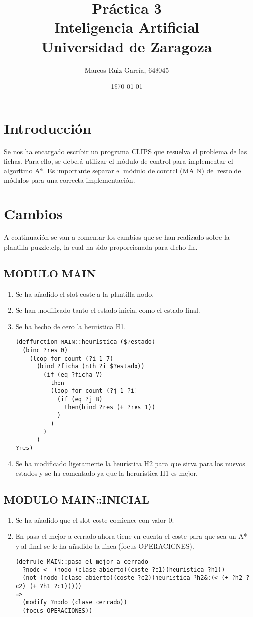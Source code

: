 \documentclass[a4paper]{article}
\title{Práctica 3 \\ Inteligencia Artificial \\ \large Universidad de Zaragoza}
\author{Marcos Ruiz García, 648045}
\date{\today}
\begin{document}
\maketitle


\section{Introducción}
Se nos ha encargado escribir un programa CLIPS que resuelva el problema de las fichas. Para ello, se deberá utilizar el módulo de control para implementar el algoritmo A*. Es importante separar el módulo de control (MAIN) del resto de módulos para una correcta implementación.

\section{Cambios}
A continuación se van a comentar los cambios que se han realizado sobre la plantilla puzzle.clp, la cual ha sido proporcionada para dicho fin.

\subsection{MODULO MAIN}
\begin{enumerate}
\item Se ha añadido el slot coste a la plantilla nodo.
\item Se han modificado tanto el estado-inicial como el estado-final.
\item Se ha hecho de cero la heurística H1.
\begin{lstlisting}
(deffunction MAIN::heuristica ($?estado)
  (bind ?res 0)
    (loop-for-count (?i 1 7)
      (bind ?ficha (nth ?i $?estado))
        (if (eq ?ficha V)
          then
          (loop-for-count (?j 1 ?i)
            (if (eq ?j B)
              then(bind ?res (+ ?res 1))
            )
          )
        )
      )
?res)
\end{lstlisting}
\item Se ha modificado ligeramente la heurística H2 para que sirva para los nuevos estados y se ha comentado ya que la herurística H1 es mejor.
\end{enumerate}
\subsection{MODULO MAIN::INICIAL}
\begin{enumerate}
\item Se ha añadido que el slot coste comience con valor 0.
\item En pasa-el-mejor-a-cerrado ahora tiene en cuenta el coste para que sea un A* y al final se le ha añadido la línea (focus OPERACIONES).
\begin{lstlisting}
(defrule MAIN::pasa-el-mejor-a-cerrado
  ?nodo <- (nodo (clase abierto)(coste ?c1)(heuristica ?h1))
  (not (nodo (clase abierto)(coste ?c2)(heuristica ?h2&:(< (+ ?h2 ?c2) (+ ?h1 ?c1)))))
=>
  (modify ?nodo (clase cerrado))
  (focus OPERACIONES))
\end{lstlisting}
\end{enumerate}
\end{document}
